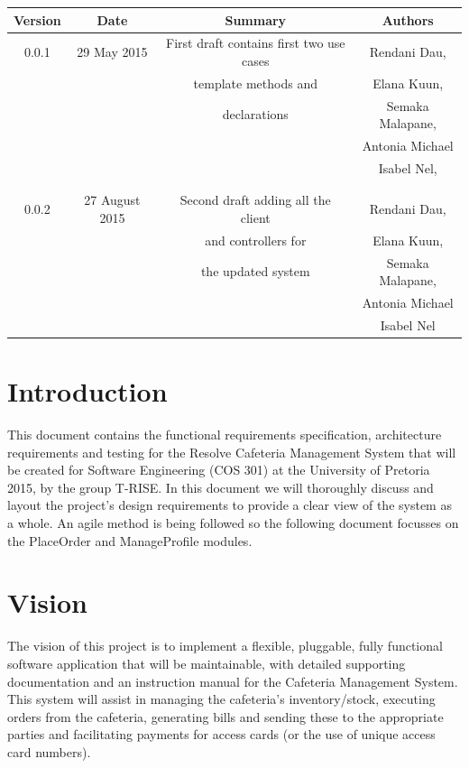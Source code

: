 \documentclass[a4paper,12pt]{report}
\begin{document}
\begin{table}[h!]
\centering
 \begin{tabular}{||c c c c||} 
 \hline
 \textbf{Version} & \textbf{Date} & \textbf{Summary} & \textbf{Authors} \\ [0.5ex] 
 \hline\hline
 0.0.1 & 29 May 2015 &  First draft contains first two use cases  & Rendani Dau, \\ & & template methods and  & Elana Kuun, \\ & &  declarations& Semaka Malapane, \\ & & & Antonia Michael \\ & & & Isabel Nel, \\ & & & \\
 \hline 
 & & & \\
 0.0.2 & 27 August 2015 &  Second draft adding all the client & Rendani Dau, \\ & & and controllers for & Elana Kuun, \\ & & the updated system & Semaka Malapane, \\ & & &  Antonia Michael \\ & & & Isabel Nel \\   [1ex] 
 \hline  
 \end{tabular}
\end{table}

\pagebreak



\section{Introduction}
This document contains the functional requirements specification, architecture requirements and testing for the Resolve Cafeteria Management System that will be created for Software Engineering (COS 301) at the University of Pretoria 2015, by the group T-RISE. In this document we will thoroughly discuss and layout the project's design requirements to provide a clear view of the system as a whole. An agile method is being followed so the following document focusses on the PlaceOrder and ManageProfile modules.

\section{Vision}
The vision of this project is to implement a flexible, pluggable, fully functional software application that will be maintainable, with detailed supporting documentation and an instruction manual for the Cafeteria Management System. This system will assist in managing the cafeteria's inventory/stock, executing orders from the cafeteria, generating bills and sending these to the appropriate parties and facilitating payments for access cards (or the use of unique access card numbers). 
\end{document}
